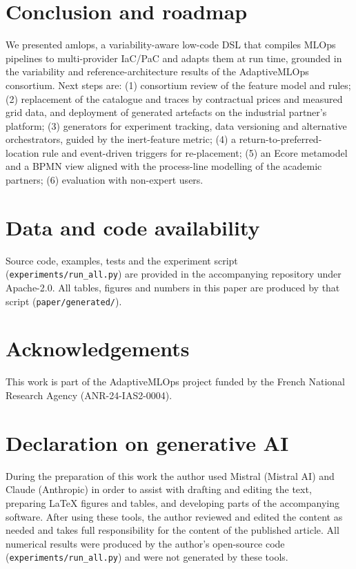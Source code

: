 \documentclass[10pt,a4paper]{article}
\newcommand{\tool}{\textsf{amlops}}
\begin{document}
\section{Conclusion and roadmap}
We presented \tool, a variability-aware low-code DSL that compiles MLOps pipelines
to multi-provider IaC/PaC and adapts them at run time, grounded in the variability
and reference-architecture results of the AdaptiveMLOps consortium. Next steps are:
(1) consortium review of the feature model and rules; (2) replacement of the
catalogue and traces by contractual prices and measured grid data, and deployment
of generated artefacts on the industrial partner's platform; (3) generators for
experiment tracking, data versioning and alternative orchestrators, guided by the
inert-feature metric; (4) a return-to-preferred-location rule and event-driven
triggers for re-placement; (5) an Ecore metamodel and a BPMN view aligned with the
process-line modelling of the academic partners; (6) evaluation with non-expert
users.

\section*{Data and code availability}\label{sec:availability}
Source code, examples, tests and the experiment script (\texttt{experiments/run\_all.py})
are provided in the accompanying repository under Apache-2.0. All tables, figures and
numbers in this paper are produced by that script (\texttt{paper/generated/}).

\section*{Acknowledgements}
This work is part of the AdaptiveMLOps project funded by the French National Research
Agency (ANR-24-IAS2-0004).

\section*{Declaration on generative AI}
During the preparation of this work the author used Mistral (Mistral AI) and Claude (Anthropic) in order to assist with drafting and editing the text, preparing \LaTeX{} figures and tables, and developing parts of the accompanying software. After using these tools, the author reviewed and edited the content as needed and takes full responsibility for the content of the published article. All numerical results were produced by the author's open-source code (\texttt{experiments/run\_all.py}) and were not generated by these tools.
\end{document}
